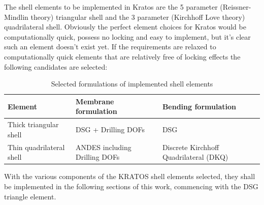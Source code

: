 The shell elements to be implemented in Kratos are the 5 parameter (Reissner-Mindlin theory) triangular shell and the 3 parameter (Kirchhoff Love theory) quadrilateral shell. Obviously the perfect element choices for Kratos would be computationally quick, possess no locking and easy to implement, but it's clear such an element doesn't exist yet. If the requirements are relaxed to computationally quick elements that are relatively free of locking effects the following candidates are selected:

\begin{table}[H]
	\begin{tabularx}{\textwidth}{ | l | X |  X | }
		\hline
		\textbf{Element} 		& 	\textbf{Membrane formulation}	&		\textbf{Bending formulation}	\\
		\hline
		Thick triangular shell
		&
		DSG + Drilling DOFs
		&
		DSG \\
		\hline
		Thin quadrilateral shell
		&
		ANDES including Drilling DOFs
		&
		Discrete Kirchhoff Quadrilateral (DKQ) \\
		\hline
	\end{tabularx}
	\caption{Selected formulations of implemented shell elements}
	\label{table:2}
\end{table}

With the various components of the KRATOS shell elements selected, they shall be implemented in the following sections of this work, commencing with the DSG triangle element.